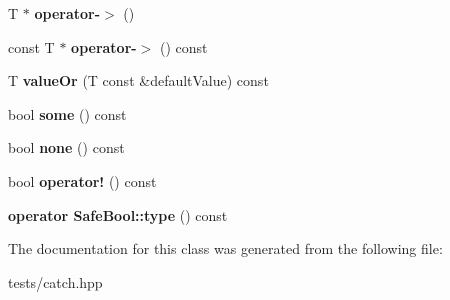 \begin{DoxyCompactItemize}
T $\ast$ {\bfseries operator-\/$>$} ()
\item 
\mbox{\label{class_catch_1_1_option_ae8343cbc36dbb95b2dce333d2a6fdc28}} 
const T $\ast$ {\bfseries operator-\/$>$} () const
\item 
\mbox{\label{class_catch_1_1_option_a8d9ae2e30b0eb76fe134a6fbc8423124}} 
T {\bfseries value\+Or} (T const \&default\+Value) const
\item 
\mbox{\label{class_catch_1_1_option_a97c95829afbe92f2bcc5fd75b32c0825}} 
bool {\bfseries some} () const
\item 
\mbox{\label{class_catch_1_1_option_a821753afdc3fac947a13a01fbe0d248e}} 
bool {\bfseries none} () const
\item 
\mbox{\label{class_catch_1_1_option_a96dccb86bdf45ee0c08e122b6133bef3}} 
bool {\bfseries operator!} () const
\item 
\mbox{\label{class_catch_1_1_option_a8ed8de7b072f893c85df14913dbbe197}} 
{\bfseries operator Safe\+Bool\+::type} () const
\end{DoxyCompactItemize}


The documentation for this class was generated from the following file\+:\begin{DoxyCompactItemize}
\item 
tests/catch.\+hpp\end{DoxyCompactItemize}
